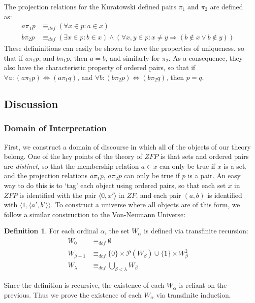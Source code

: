 \documentclass[11pt]{report}
\newcommand{\eqdef}{\equiv_\mathit{def}}
\newcommand{\pleft}{\mathrel{\pi_1}}
\newcommand{\pright}{\mathrel{\pi_2}}
\newcommand{\pair}[2]{\langle #1,#2 \rangle}
\theoremstyle{definition}
\theoremstyle{theorem}
\theoremstyle{lemma}
\newtheorem{definition}{Definition}[section]
\begin{document}
The projection relations for the Kuratowski defined pairs $\pleft$ and $\pright$ are defined as:
\begin{align*}
a\pleft p &\eqdef (\forall x\in p: a\in x) \\
b\pright p &\eqdef (\exists x\in p: b\in x) \wedge
                (\forall x,y \in p: x\neq y \Rightarrow (b\notin x \vee b\notin y))
\end{align*}
These defininitions can easily be shown to have the properties of uniqueness, so that if $a\pleft p$, and $b\pleft p$, then $a=b$, and similarly for $\pright$. As a consequence, they also have the characteristic property of ordered pairs, so that if $\forall a: (a\pleft p)\Leftrightarrow(a\pleft q)$, and $\forall b: (b\pright p)\Leftrightarrow(b\pright q)$, then $p=q$.

\subsection{Discussion}

\subsubsection{Domain of Interpretation}
First, we construct a domain of discourse in which all of the objects of our theory belong.
One of the key points of the theory of $\mathit{ZFP}$ is that sets and ordered pairs are \emph{distinct}, so that the membership relation $a\in x$ can only be true if $x$ is a set, and the projection relations $a\pleft p$, $a\pright p$ can only be true if $p$ is a pair.
An easy way to do this is to `tag' each object using ordered pairs, so that each set $x$ in $\mathit{ZFP}$ is identified with the pair $\pair{0}{x'}$ in $\mathit{ZF}$, and each pair $(a,b)$ is identified with $\pair{1}{\pair{a'}{b'}}$. To construct a universe where all objects are of this form, we follow a similar construction to the Von-Neumann Universe:

\begin{definition} For each ordinal $\alpha$, the set $W_\alpha$ is defined via transfinite recursion:
\begin{align*}
 W_0 &\eqdef \emptyset\\
 W_{\beta+1} &\eqdef \{0\}\times\mathcal{P}(W_\beta) \cup \{1\}\times W_\beta^2 \\
 W_\lambda &\eqdef \bigcup_{\beta < \lambda} W_\beta
\end{align*}
\end{definition}
\noindent
Since the definition is recursive, the existence of each $W_\alpha$ is reliant on the previous. Thus we prove the existence of each $W_\alpha$ via transfinite induction.
\end{document}
